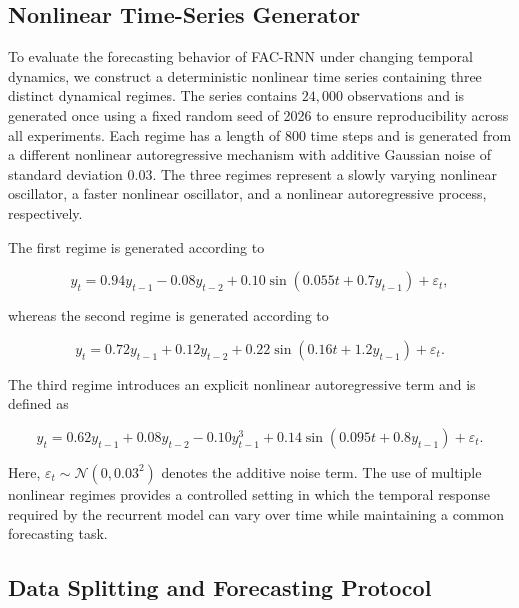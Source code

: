 \documentclass[journal]{IEEEtran}
\begin{document}
\subsection{Nonlinear Time-Series Generator}
\label{subsec:data_generator}

To evaluate the forecasting behavior of FAC-RNN under changing temporal dynamics, we construct a deterministic nonlinear time series containing three distinct dynamical regimes. The series contains $24{,}000$ observations and is generated once using a fixed random seed of 2026 to ensure reproducibility across all experiments. Each regime has a length of 800 time steps and is generated from a different nonlinear autoregressive mechanism with additive Gaussian noise of standard deviation 0.03. The three regimes represent a slowly varying nonlinear oscillator, a faster nonlinear oscillator, and a nonlinear autoregressive process, respectively.

The first regime is generated according to

\begin{equation}
	y_t
	=
	0.94y_{t-1}
	-0.08y_{t-2}
	+0.10\sin(0.055t+0.7y_{t-1})
	+\varepsilon_t,
	\label{eq:regime_a}
\end{equation}

whereas the second regime is generated according to

\begin{equation}
	y_t
	=
	0.72y_{t-1}
	+0.12y_{t-2}
	+0.22\sin(0.16t+1.2y_{t-1})
	+\varepsilon_t.
	\label{eq:regime_b}
\end{equation}

The third regime introduces an explicit nonlinear autoregressive term and is defined as

\begin{equation}
	y_t
	=
	0.62y_{t-1}
	+0.08y_{t-2}
	-0.10y_{t-1}^{3}
	+0.14\sin(0.095t+0.8y_{t-1})
	+\varepsilon_t.
	\label{eq:regime_c}
\end{equation}

Here, $\varepsilon_t\sim\mathcal{N}(0,0.03^2)$ denotes the additive noise term. The use of multiple nonlinear regimes provides a controlled setting in which the temporal response required by the recurrent model can vary over time while maintaining a common forecasting task.

\subsection{Data Splitting and Forecasting Protocol}
\label{subsec:protocol}
\end{document}
